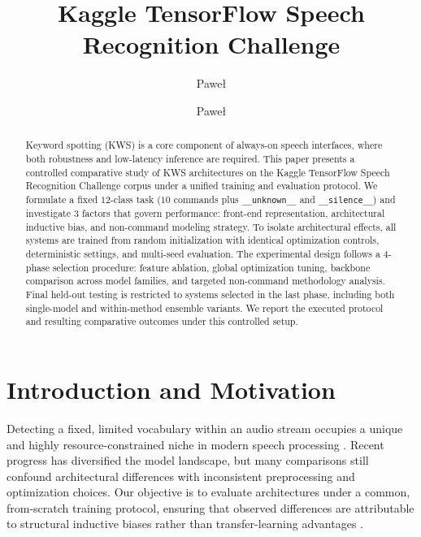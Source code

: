 \documentclass[cameraready]{Interspeech}
\title{Kaggle TensorFlow Speech Recognition Challenge}
\author[affiliation={1}]{Paweł}{Pozorski}
\author[affiliation={1}]{Paweł}{Florek}
\begin{document}
\maketitle

\begin{abstract}
Keyword spotting (KWS) is a core component of always-on speech interfaces, where both robustness and low-latency inference are required. This paper presents a controlled comparative study of KWS architectures on the Kaggle TensorFlow Speech Recognition Challenge corpus under a unified training and evaluation protocol. We formulate a fixed $12$-class task ($10$ commands plus \texttt{\_\_unknown\_\_} and \texttt{\_\_silence\_\_}) and investigate $3$ factors that govern performance: front-end representation, architectural inductive bias, and non-command modeling strategy. To isolate architectural effects, all systems are trained from random initialization with identical optimization controls, deterministic settings, and multi-seed evaluation. The experimental design follows a $4$-phase selection procedure: feature ablation, global optimization tuning, backbone comparison across model families, and targeted non-command methodology analysis. Final held-out testing is restricted to systems selected in the last phase, including both single-model and within-method ensemble variants. We report the executed protocol and resulting comparative outcomes under this controlled setup.
\end{abstract}

\section{Introduction and Motivation}
Detecting a fixed, limited vocabulary within an audio stream occupies a unique and highly resource-constrained niche in modern speech processing \cite{sainath2015cnn, zhang2017hello}. Recent progress has diversified the model landscape, but many comparisons still confound architectural differences with inconsistent preprocessing and optimization choices. Our objective is to evaluate architectures under a common, from-scratch training protocol, ensuring that observed differences are attributable to structural inductive biases rather than transfer-learning advantages \cite{gong2021ast}.
\end{document}
